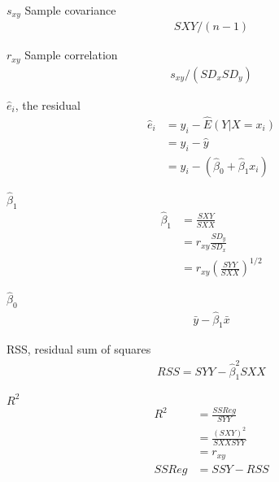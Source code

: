 \documentclass[avery5388,grid,frame]{flashcards}
\begin{document}
\begin{flashcard}[Equation]{$s_{xy}$ Sample covariance}
\bigskip\bigskip\bigskip
{\begin{align*}
SXY/(n-1)
\end{align*}}
\end{flashcard}
\begin{flashcard}[Equation]{$r_{xy}$ Sample correlation}
\bigskip\bigskip\bigskip
{\begin{align*}
s_{xy}/(SD_xSD_y)
\end{align*}}
\end{flashcard}
\begin{flashcard}[Equation]{$\hat{e}_i$, the residual}
\bigskip\bigskip\bigskip
{\begin{align*}
\hat{e}_i&=y_i-\hat{E}(Y|X=x_i)\\
&=y_i-\hat{y}\\
&=y_i-(\hat{\beta}_0+\hat{\beta}_1x_i)
\end{align*}}
\end{flashcard}
\begin{flashcard}[Equation]{$\hat{\beta}_1$}
\bigskip\bigskip\bigskip
{\begin{align*}
\hat{\beta}_1&=\frac{SXY}{SXX}\\
&=r_{xy}\frac{SD_y}{SD_x}\\
&=r_{xy}\left(\frac{SYY}{SXX}\right)^{1/2}
\end{align*}}
\end{flashcard}
\begin{flashcard}[Equation]{$\hat{\beta}_0$}
\bigskip\bigskip\bigskip
{\begin{align*}
\bar{y}-\hat{\beta}_1\bar{x}
\end{align*}}
\end{flashcard}
\begin{flashcard}[Equation]{RSS, residual sum of squares}
\bigskip\bigskip\bigskip
{\begin{align*}
RSS=SYY-\hat{\beta}_1^2SXX
\end{align*}}
\end{flashcard}
\begin{flashcard}[Equation]{$R^2$}
\bigskip\bigskip\bigskip
{\begin{align*}
R^2&=\frac{SSReg}{SYY}\\
&=\frac{(SXY)^2}{SXX SYY}\\
&=r_{xy}\\
SSReg&=SSY-RSS
\end{align*}}
\end{flashcard}
\end{document}

